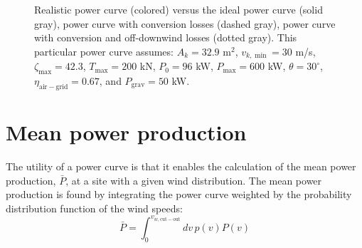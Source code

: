 \documentclass[11pt]{amsart}
\newcommand{\airgrid}{\mathrm{air-grid}}
\newcommand{\cutin}{\mathrm{cut-in}}
\newcommand{\cutout}{\mathrm{cut-out}}
\newcommand{\grav}{\mathrm{grav}}
\newcommand{\kite}{k}
\newcommand{\wind}{w}
\begin{document}
\begin{figure}[h]
\begin{center}
\caption{Realistic power curve (colored) versus the ideal power curve
  (solid gray), power curve with conversion losses (dashed gray),
  power curve with conversion and off-downwind losses (dotted gray).
  This particular power curve assumes: $A_{\kite} = 32.9$ m$^2$,
  $v_{\kite,\min} = 30$ m/s, $\zeta_{\max} = 42.3$, $T_{\max} = 200$
  kN, $P_0 = 96$ kW, $P_{\max} = 600$ kW, $\theta = 30^{\circ}$,
  $\eta_{\airgrid} = 0.67$, and $P_{\grav} = 50$ kW.}
\end{center}
\end{figure}


\section{Mean power production}

The utility of a power curve is that it enables the calculation of the
mean power production, $\bar{P}$, at a site with a given wind
distribution.  The mean power production is found by integrating the
power curve weighted by the probability distribution function of the
wind speeds:
%
\begin{equation}
\bar{P} = \int_0^{v_{\wind,\cutout}} dv\, p(v) P(v)
\end{equation}
\end{document}

